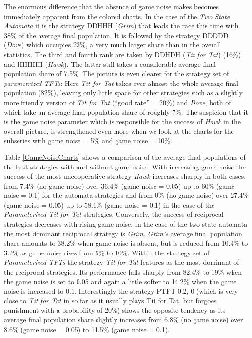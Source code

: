 The enormous difference that the absence of game noise makes becomes
immediately apparent from the colored charts. In the case of the {\em Two State
Automata} it is the strategy DDHHH ({\em Grim}) that leads the race this time
with 38\% of the average final population. It is followed by the strategy DDDDD
({\em Dove}) which occupies 23\%, a very much larger share than in the overall
statistics. The third and fourth rank are taken by DDHDH ({\em Tit for Tat})
(16\%) and HHHHH ({\em Hawk}). The latter still takes a considerable average
final population share of 7.5\%. The picture is even clearer for the strategy
set of {\em parametrized TFTs}: Here {\em Tit for Tat} takes over almost the
whole average final population (82\%), leaving only little space for other
strategies such as a slightly more friendly version of {\em Tit for Tat}
(``good rate'' = 20\%) and {\em Dove}, both of which take an average final
population share of roughly 7\%. The suspicion that it is the game noise
parameter which is responsible for the success of {\em Hawk} in the overall
picture, is strengthened even more when we look at the charts for the
subseries with game noise = 5\% and game noise = 10\%.

Table \ref{GameNoiseCharts} shows a comparison of the average final populations
of the best strategies with and without game noise. With increasing game noise
the success of the most uncooperative strategy {\em Hawk} increases sharply in
both cases, from 7.4\% (no game noise) over 36.4\% (game noise = 0.05) up to
60\% (game noise = 0.1) for the automata strategies and from 0\% (no game
noise) over 27.4\% (game noise = 0.05) up to 58.1\% (game noise = 0.1) in the
case of the {\em Parameterized Tit for Tat} strategies. Conversely, the success
of reciprocal strategies decreases with rising game noise. In the case of the
two state automata the most dominant reciprocal strategy is {\em Grim}. {\em
  Grim's} average final population share amounts to 38.2\% when game noise is
absent, but is reduced from 10.4\% to 3.2\% as game noise rises from 5\% to
10\%. Within the strategy set of {\em Parameterized TFTs} the strategy {\em
  Tit for Tat} features as the most dominant of the reciprocal strategies. Its
performance falls sharply from 82.4\% to 19\% when the game noise is set to
0.05 and again a little softer to 14.2\% when the game noise is increased to
0.1. Interestingly the strategy PTFT 0.2, 0 (which is very close to {\em Tit
  for Tat} in so far as it usually plays Tit for Tat, but forgoes punishment
with a probability of 20\%) shows the opposite tendency as its average final
population share slightly increases from 6.8\% (no game noise) over 8.6\%
(game noise = 0.05) to 11.5\% (game noise = 0.1).

